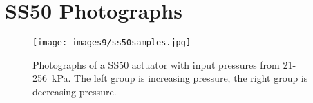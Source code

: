 \chapter{SS50 Photographs}
\label{appendix:s50all}
\begin{figure}[ht]
    \centering
     \texttt{[image: images9/ss50samples.jpg]}
    \caption{Photographs of a SS50 actuator with input pressures from 21-256~kPa. The left group is increasing pressure, the right group is decreasing pressure.}
    \label{fig:ss50samples}
\end{figure}